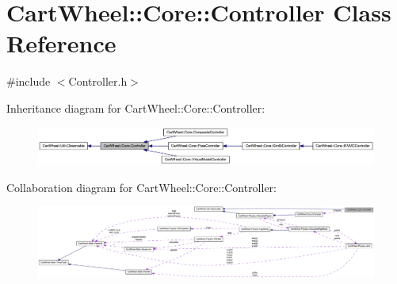\hypertarget{classCartWheel_1_1Core_1_1Controller}{
\section{CartWheel::Core::Controller Class Reference}
\label{classCartWheel_1_1Core_1_1Controller}
}


{\ttfamily \#include $<$Controller.h$>$}



Inheritance diagram for CartWheel::Core::Controller:\nopagebreak
\begin{figure}[H]
\begin{center}
\leavevmode
\includegraphics[width=400pt]{classCartWheel_1_1Core_1_1Controller__inherit__graph}
\end{center}
\end{figure}


Collaboration diagram for CartWheel::Core::Controller:\nopagebreak
\begin{figure}[H]
\begin{center}
\leavevmode
\includegraphics[width=400pt]{classCartWheel_1_1Core_1_1Controller__coll__graph}
\end{center}
\end{figure}
